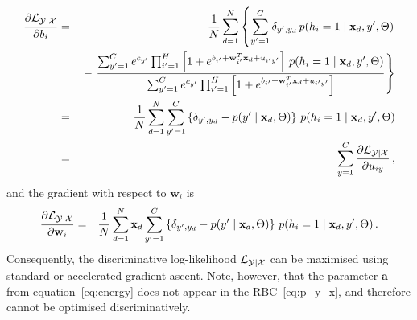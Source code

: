 \documentclass[a4paper]{article}
\renewcommand{\v}[1]{\mathbf{#1}}
\renewcommand{\c}[1]{{\cal #1}}
\begin{document}
\begin{eqnarray}
\frac{\partial\c{L}_{\c{Y}|\c{X}}}{\partial b_{i}}
& = & 
\frac{1}{N}\sum_{d=1}^N\left\{\sum_{y'=1}^{C}
\delta_{y',y_d}\,p(h_i=1\;|\;\v{x}_d,y',\Theta)\right.
\nonumber\\&&
{}-\left.\frac{\sum_{y'=1}^{C}e^{c_{y'}}\prod_{i'=1}^{H}\left[1+e^{b_{i'}+ \v{w}_{i'}^T\v{x}_d+u_{i'y'  }}\right]
\,p(h_i=1\;|\;\v{x}_d,y',\Theta)}
{\sum_{y'=1}^{C}e^{c_{y'}}\prod_{i'=1}^{H}\left[1+e^{b_{i'}+ \v{w}_{i'}^T\v{x}_d+u_{i'y'}}\right]}
\right\}
\nonumber\\&=&
\frac{1}{N}\sum_{d=1}^N\sum_{y'=1}^{C}\left\{
\delta_{y',y_d}-p(y'\;|\;\v{x}_d,\Theta)\right\}\,p(h_i=1\;|\;\v{x}_d,y',\Theta)
\nonumber\\&=&
\sum_{y=1}^{C}\frac{\partial\c{L}_{\c{Y}|\c{X}}}{\partial u_{iy}}
\,,
\end{eqnarray}
and the gradient with respect to $\v{w}_i$ is
\begin{eqnarray}
\frac{\partial\c{L}_{\c{Y}|\c{X}}}{\partial \v{w}_{i}}
& = & 
\frac{1}{N}\sum_{d=1}^N\v{x}_d\sum_{y'=1}^{C}\left\{
\delta_{y',y_d}-p(y'\;|\;\v{x}_d,\Theta)\right\}\,p(h_i=1\;|\;\v{x}_d,y',\Theta)
\,.
\end{eqnarray}
Consequently, the discriminative log-likelihood $\c{L}_{\c{Y}|\c{X}}$ can be maximised using standard or accelerated
gradient ascent. Note, however, that the parameter $\v{a}$ from equation~\eqref{eq:energy}
does not appear in the RBC~\eqref{eq:p_y_x}, and therefore cannot be optimised discriminatively.
\end{document}
